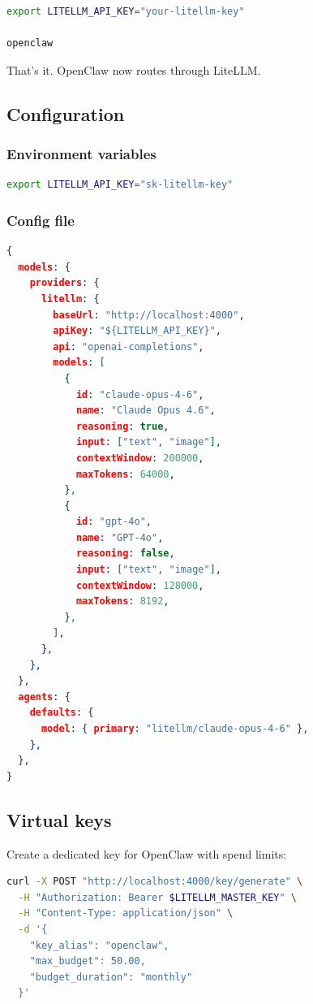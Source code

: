 \begin{lstlisting}[language=bash]
export LITELLM_API_KEY="your-litellm-key"

openclaw
\end{lstlisting}


That's it. OpenClaw now routes through LiteLLM.

\subsection{Configuration}


\subsubsection{Environment variables}


\begin{lstlisting}[language=bash]
export LITELLM_API_KEY="sk-litellm-key"
\end{lstlisting}


\subsubsection{Config file}


\begin{lstlisting}[language=json]
{
  models: {
    providers: {
      litellm: {
        baseUrl: "http://localhost:4000",
        apiKey: "${LITELLM_API_KEY}",
        api: "openai-completions",
        models: [
          {
            id: "claude-opus-4-6",
            name: "Claude Opus 4.6",
            reasoning: true,
            input: ["text", "image"],
            contextWindow: 200000,
            maxTokens: 64000,
          },
          {
            id: "gpt-4o",
            name: "GPT-4o",
            reasoning: false,
            input: ["text", "image"],
            contextWindow: 128000,
            maxTokens: 8192,
          },
        ],
      },
    },
  },
  agents: {
    defaults: {
      model: { primary: "litellm/claude-opus-4-6" },
    },
  },
}
\end{lstlisting}


\subsection{Virtual keys}


Create a dedicated key for OpenClaw with spend limits:

\begin{lstlisting}[language=bash]
curl -X POST "http://localhost:4000/key/generate" \
  -H "Authorization: Bearer $LITELLM_MASTER_KEY" \
  -H "Content-Type: application/json" \
  -d '{
    "key_alias": "openclaw",
    "max_budget": 50.00,
    "budget_duration": "monthly"
  }'
\end{lstlisting}



